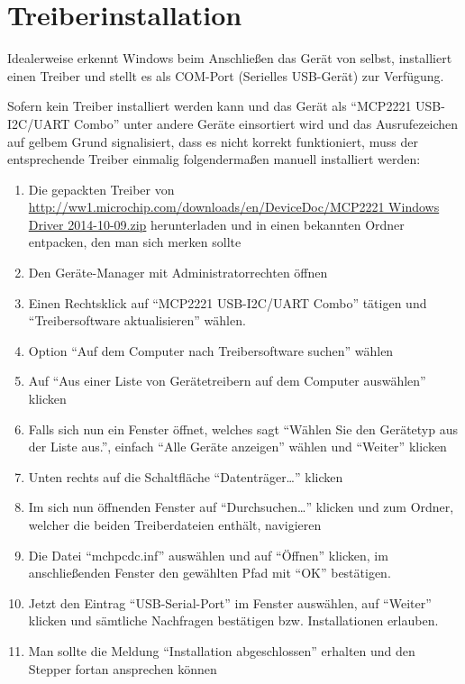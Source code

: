\documentclass[paper=a4, open=any, numbers=noenddot]{scrbook}
\begin{document}
		\section{Treiberinstallation}
			Idealerweise erkennt Windows beim Anschließen das Gerät von selbst, installiert einen Treiber und stellt es als COM-Port (Serielles USB-Gerät) zur Verfügung.

			Sofern kein Treiber installiert werden kann und das Gerät als \enquote{MCP2221 USB-I2C/UART Combo} unter andere Geräte einsortiert wird und das Ausrufezeichen auf gelbem Grund signalisiert, dass es nicht korrekt funktioniert, muss der entsprechende Treiber einmalig folgendermaßen manuell installiert werden:
			\begin{enumerate}
				\item Die gepackten Treiber von \url{http://ww1.microchip.com/downloads/en/DeviceDoc/MCP2221 Windows Driver 2014-10-09.zip} herunterladen und in einen bekannten Ordner entpacken, den man sich merken sollte
				\item Den Geräte-Manager mit Administratorrechten öffnen
				\item Einen Rechtsklick auf \enquote{MCP2221 USB-I2C/UART Combo} tätigen und \enquote{Treibersoftware aktualisieren} wählen.
				\item Option \enquote{Auf dem Computer nach Treibersoftware suchen} wählen
				\item Auf \enquote{Aus einer Liste von Gerätetreibern auf dem Computer auswählen} klicken
				\item Falls sich nun ein Fenster öffnet, welches sagt \enquote{Wählen Sie den Gerätetyp aus der Liste aus.}, einfach \enquote{Alle Geräte anzeigen} wählen und \enquote{Weiter} klicken
				\item Unten rechts auf die Schaltfläche \enquote{Datenträger\dots} klicken
				\item Im sich nun öffnenden Fenster auf \enquote{Durchsuchen\dots} klicken und zum Ordner, welcher die beiden Treiberdateien enthält, navigieren
				\item Die Datei \enquote{mchpcdc.inf} auswählen und auf \enquote{Öffnen} klicken, im anschließenden Fenster den gewählten Pfad mit \enquote{OK} bestätigen.
				\item Jetzt den Eintrag \enquote{USB-Serial-Port} im Fenster auswählen, auf \enquote{Weiter} klicken und sämtliche Nachfragen bestätigen bzw. Installationen erlauben.
				\item Man sollte die Meldung \enquote{Installation abgeschlossen} erhalten und den Stepper fortan ansprechen können
			\end{enumerate}
\end{document}
